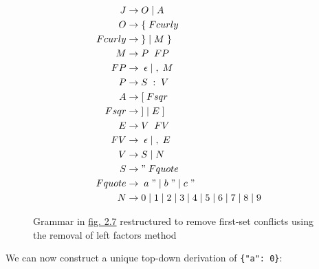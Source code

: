 \begin{figure}[H]
    \begin{center}
        \begin{equation}
            \begin{split}
                J &\rightarrow	O\;|\;A\\
                O &\rightarrow	\{\;Fcurly\\
                Fcurly &\rightarrow\;\}\;|\;M\;\}\\
                M &\rightarrow	P\;\;FP\\
                FP &\rightarrow\;\epsilon\;|\;,\;M\\
                P &\rightarrow	S\;:\;V\\
                A &\rightarrow	[\;Fsqr\\
                Fsqr &\rightarrow \;]\;|\;E\;]\\
                E &\rightarrow	V\;\;FV\\
                FV &\rightarrow\;\epsilon\;|\;,\;E\\
                V &\rightarrow	S\;|\;N\\
                S &\rightarrow	"\;Fquote\\
                Fquote &\rightarrow\;a\;"\;|\;b\;"\;|\;c\;"\\
                N &\rightarrow	0\;|\;1\;|\;2\;|\;3\;|\;4\;|\;5\;|\;6\;|\;7\;|\;8\;|\;9
            \end{split}
            \nonumber
        \end{equation}
    \end{center}
    \vspace{-1em}
    \caption{\label{fig:2.9}Grammar in \hyperref[fig:2.7]{fig. 2.7} restructured to remove first-set conflicts using the removal of left factors method}
\end{figure}

\pagebreak

We can now construct a unique top-down derivation of \verb|{"a": 0}|:

